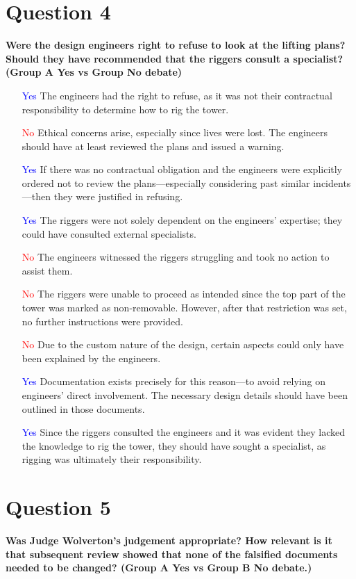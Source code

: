 \documentclass[12pt]{article}
\begin{document}
\section{Question 4}
\textbf{Were the design engineers right to refuse to look at the lifting plans? Should they have recommended that the riggers consult a specialist?  (Group A Yes vs Group No debate)}

\begin{itemize}
    \item [\textcolor{blue}{Yes}] The engineers had the right to refuse, as it was not their contractual responsibility to determine how to rig the tower.
    \item [\textcolor{red}{No}] Ethical concerns arise, especially since lives were lost. The engineers should have at least reviewed the plans and issued a warning.
    \item [\textcolor{blue}{Yes}] If there was no contractual obligation and the engineers were explicitly ordered not to review the plans—especially considering past similar incidents—then they were justified in refusing.
    \item [\textcolor{blue}{Yes}] The riggers were not solely dependent on the engineers' expertise; they could have consulted external specialists.
    \item [\textcolor{red}{No}] The engineers witnessed the riggers struggling and took no action to assist them.
    \item [\textcolor{red}{No}] The riggers were unable to proceed as intended since the top part of the tower was marked as non-removable. However, after that restriction was set, no further instructions were provided.
    \item [\textcolor{red}{No}] Due to the custom nature of the design, certain aspects could only have been explained by the engineers.
    \item [\textcolor{blue}{Yes}] Documentation exists precisely for this reason—to avoid relying on engineers' direct involvement. The necessary design details should have been outlined in those documents.
    \item [\textcolor{blue}{Yes}] Since the riggers consulted the engineers and it was evident they lacked the knowledge to rig the tower, they should have sought a specialist, as rigging was ultimately their responsibility.
\end{itemize}

\section{Question 5}
\textbf{Was Judge Wolverton’s judgement appropriate? How relevant is it that subsequent review showed that none of the falsified documents needed to be changed?  (Group A Yes vs Group B No debate.)}
\end{document}
